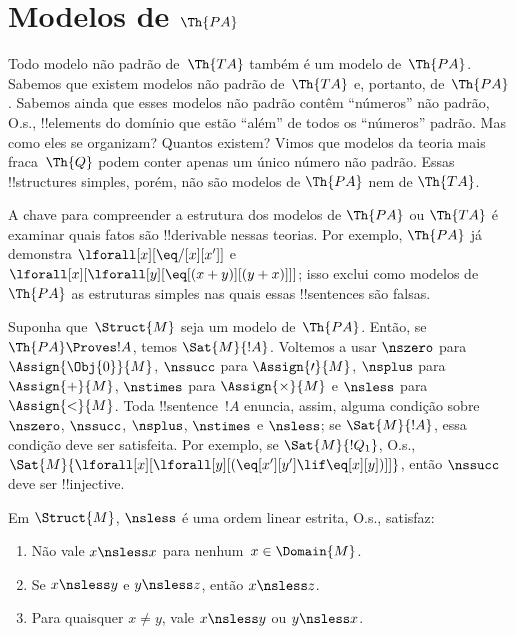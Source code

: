 \documentclass[../../../include/open-logic-section]{subfiles}
\begin{document}
\section{Modelos de $\Th{PA}$}

\begin{explain}
Todo modelo não padrão de~$\Th{TA}$ também é um modelo de~$\Th{PA}$.
Sabemos que existem modelos não padrão de~$\Th{TA}$ e, portanto,
de~$\Th{PA}$. Sabemos ainda que esses modelos não padrão contêm
``números'' não padrão, O.s.\@, !!{element}s do domínio que estão
``além'' de todos os ``números'' padrão. Mas como eles se organizam?
Quantos existem? Vimos que modelos da teoria mais fraca~$\Th{Q}$ podem
conter apenas um único número não padrão. Essas !!{structure}s simples,
porém, não são modelos de $\Th{PA}$ nem de $\Th{TA}$.

A chave para compreender a estrutura dos modelos de $\Th{PA}$ ou
$\Th{TA}$ é examinar quais fatos são !!{derivable} nessas teorias. Por
exemplo, $\Th{PA}$ já demonstra $\lforall[x][\eq/[x][x']]$ e
$\lforall[x][\lforall[y][\eq[(x+y)][(y+x)]]]$; isso exclui como modelos
de~$\Th{PA}$ as estruturas simples nas quais essas !!{sentence}s são
falsas.

Suponha que~$\Struct{M}$ seja um modelo de~$\Th{PA}$. Então, se
$\Th{PA} \Proves !A$, temos $\Sat{M}{!A}$. Voltemos a usar $\nszero$
para $\Assign{\Obj{0}}{M}$, $\nssucc$ para $\Assign{\prime}{M}$,
$\nsplus$ para $\Assign{+}{M}$, $\nstimes$ para
$\Assign{\times}{M}$ e $\nsless$ para $\Assign{<}{M}$. Toda
!!{sentence}~$!A$ enuncia, assim, alguma condição sobre $\nszero$,
$\nssucc$, $\nsplus$, $\nstimes$ e $\nsless$; se $\Sat{M}{!A}$, essa
condição deve ser satisfeita. Por exemplo, se $\Sat{M}{!Q_1}$, O.s.\@,
$\Sat{M}{\lforall[x][\lforall[y][(\eq[x'][y'] \lif \eq[x][y])]]}$,
então $\nssucc$ deve ser !!{injective}.
\end{explain}

\begin{prop}
Em $\Struct{M}$, $\nsless$ é uma ordem linear estrita, O.s.\@,
satisfaz:
\begin{enumerate}
\item Não vale $x \nsless x$ para nenhum~$x \in \Domain{M}$.
\item Se $x \nsless y$ e $y \nsless z$, então $x \nsless z$.
\item Para quaisquer $x \neq y$, vale $x \nsless y$ ou $y \nsless x$.
\end{enumerate}
\end{prop}
\end{document}
